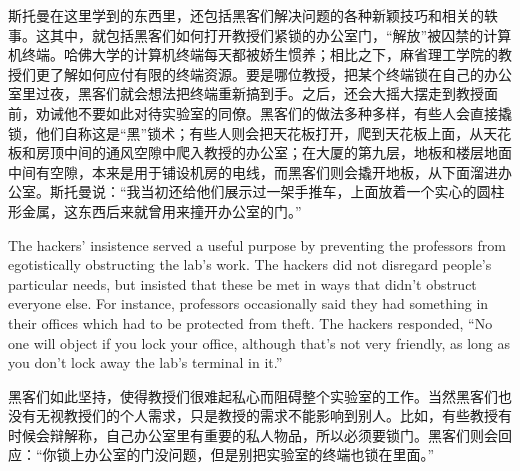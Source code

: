 \ifdefined\chs
斯托曼在这里学到的东西里，还包括黑客们解决问题的各种新颖技巧和相关的轶事。这其中，就包括黑客们如何打开教授们紧锁的办公室门，``解放''被囚禁的计算机终端。哈佛大学的计算机终端每天都被娇生惯养；相比之下，麻省理工学院的教授们更了解如何应付有限的终端资源。要是哪位教授，把某个终端锁在自己的办公室里过夜，黑客们就会想法把终端重新搞到手。之后，还会大摇大摆走到教授面前，劝诫他不要如此对待实验室的同僚。黑客们的做法多种多样，有些人会直接撬锁，他们自称这是``黑''锁术；有些人则会把天花板打开，爬到天花板上面，从天花板和房顶中间的通风空隙中爬入教授的办公室；在大厦的第九层，地板和楼层地面中间有空隙，本来是用于铺设机房的电线，而黑客们则会撬开地板，从下面溜进办公室。斯托曼说：``我当初还给他们展示过一架手推车，上面放着一个实心的圆柱形金属，这东西后来就曾用来撞开办公室的门。''
\fi

\ifdefined\vtwo

\ifdefined\eng
The hackers' insistence served a useful purpose by preventing the professors from egotistically obstructing the lab's work.  The hackers did not disregard people's particular needs, but insisted that these be met in ways that didn't obstruct everyone else.  For instance, professors occasionally said they had something in their offices which had to be protected from theft.  The hackers responded, ``No one will object if you lock your office, although that's not very friendly, as long as you don't lock away the lab's terminal in it.''
\fi

\ifdefined\chs
黑客们如此坚持，使得教授们很难起私心而阻碍整个实验室的工作。当然黑客们也没有无视教授们的个人需求，只是教授的需求不能影响到别人。比如，有些教授有时候会辩解称，自己办公室里有重要的私人物品，所以必须要锁门。黑客们则会回应：``你锁上办公室的门没问题，但是别把实验室的终端也锁在里面。''
\fi
\fi

